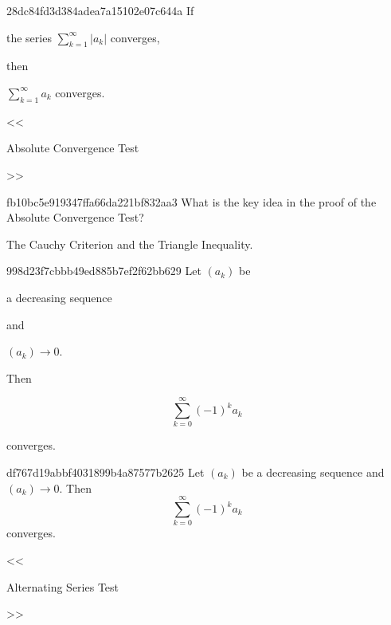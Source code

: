 \begin{note}{28dc84fd3d384adea7a15102e07c644a}
    If \begin{icloze}{2}the series \({ \sum_{k=1}^{\infty} \left\lvert a_k \right\rvert }\) converges,\end{icloze} then \begin{icloze}{1}\({ \sum_{k=1}^{\infty} a_k }\) converges.\end{icloze}

    \begin{center}
        \tiny
        <<\begin{icloze}{3}Absolute Convergence Test\end{icloze}>>
    \end{center}
\end{note}

\begin{note}{fb10bc5e919347ffa66da221bf832aa3}
    What is the key idea in the proof of the Absolute Convergence Test?

    \begin{cloze}{1}
        The Cauchy Criterion and the Triangle Inequality.
    \end{cloze}
\end{note}

\begin{note}{998d23f7cbbb49ed885b7ef2f62bb629}
    Let \({ (a_k) }\) be \begin{icloze}{4}a decreasing sequence\end{icloze} and \begin{icloze}{3}\({ (a_k) \to 0 }\).\end{icloze}
    Then
    \begin{icloze}{2}
        \[
            \sum_{k=0}^{\infty} (-1)^{k}a_k
        \]
    \end{icloze}
    \begin{icloze}{1}converges.\end{icloze}
\end{note}

\begin{note}{df767d19abbf4031899b4a87577b2625}
    Let \({ (a_k) }\) be a decreasing sequence and \({ (a_k) \to 0 }\).
    Then
    \[
        \sum_{k=0}^{\infty} (-1)^{k}a_k
    \]
    converges.

    \begin{center}
        \tiny
        <<\begin{icloze}{1}Alternating Series Test\end{icloze}>>
    \end{center}
\end{note}

